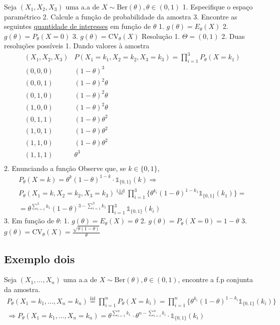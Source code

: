 \documentclass[
  letterpaper,
  DIV=11,
  numbers=noendperiod]{scrreprt}
\begin{document}
Seja \((X_{1},X_{2},X_{3})\) uma a.a de
\(X\sim \text{Ber}(\theta), \theta \in (0,1)\) 1. Especifique o espaço
paramétrico 2. Calcule a função de probabilidade da amostra 3. Encontre
as seguintes \href{quantidade-de-interesse.qmd}{quantidade de
interesses} em função de \(\theta\) 1. \(g(\theta)=E_\theta(X)\) 2.
\(g(\theta)=P_\theta(X=0)\) 3. \(g(\theta)=\mathrm{CV}_\theta(X)\)
Resolução 1. \(\Theta=(0,1)\) 2. Duas resoluções possíveis 1. Dando
valores à amostra \[\begin{aligned}
         &(X_{1}, X_{2},X_{3})  &P(X_{1}= k_{1},X_{2}= k_{2},X_{3}= k_{3})= \prod ^{3}_{i=1}P_\theta(X=k_{1})\\
         &(0,0,0) &(1-\theta)^{3}\\
         &(0,0,1) &(1-\theta)^{2}\theta\\
         &(0,1,0) &(1-\theta)^{2}\theta\\
         &(1,0,0) &(1-\theta)^{2}\theta\\
         &(0,1,1) &(1-\theta)\theta^2\\
         &(1,0,1) &(1-\theta)\theta^{2}\\
         &(1,1,0) &(1-\theta)\theta^{2}\\
         &(1,1,1) &\theta^{3}\\
         \end{aligned}
    \] 2. Enunciando a função Observe que, se \(k \in \{0,1 \}\),
\[\begin{aligned}
       &P_\theta(X=k)=\theta^{k}(1-\theta)^{1-k}\cdot\mathbb{1}_{\{0,1 \}}(k)\Rightarrow\\
       &P_\theta(X_{1}=k,X_{2}=k_{2},X_{3}= k_{3})\stackrel{\text{i.i.d}}{=}\prod^{3}_{i=1}\{\theta^{k_{i}}
       (1-\theta)^{1-k_{1}}\mathbb{1}_{\{0,1 \}}(k_{1}) \} = \\
       &= \theta^{\sum\limits^{3}_{i=1}k_{1}}(1-\theta)^{3-\sum\limits^{3}_{i=1}k_{1}}\prod^{3}_{i=1}\mathbb{1}_{\{0,1\}}
       (k_{i})
       \end{aligned}
    \] 3. Em função de \(\theta\): 1. \(g(\theta)=E_\theta(X)=\theta\)
2. \(g(\theta)=P_\theta(X=0)=1-\theta\) 3.
\(g(\theta)=\mathrm{CV}_\theta(X)=\frac{\sqrt{\theta(1-\theta)}}{\theta}\)

\subsection{Exemplo dois}\label{exemplo-dois}

Seja \((X_{1},\dots,X_{n})\) uma a.a de
\(X\sim\text{Ber}(\theta), \theta \in(0,1)\), encontre a f.p conjunta da
amostra. \[
\begin{aligned}
P_\theta(X_{1}=k_{1},\dots,X_{n}=k_{n})\stackrel{\text{iid}}{=}\prod ^{n}_{i=1}P_\theta(X=k_{i})=\prod^{n}_{i=1}
\{\theta^{k_{i}}(1-\theta)^{1-k_{i}}\mathbb{1}_{\{0,1 \}}(k_{i}) \}\\
\Rightarrow P_\theta(X_{1}=k_{1},\dots,X_{n}=k_{n})=\theta^{\sum\limits^{n}_{i=1}k_{1}}\cdot 
\theta^{n-\sum\limits^{n}_{i=i}k_{i}}\cdot\mathbb{1}_{\{0,1\}}(k_{i})
\end{aligned}
\]
\end{document}
